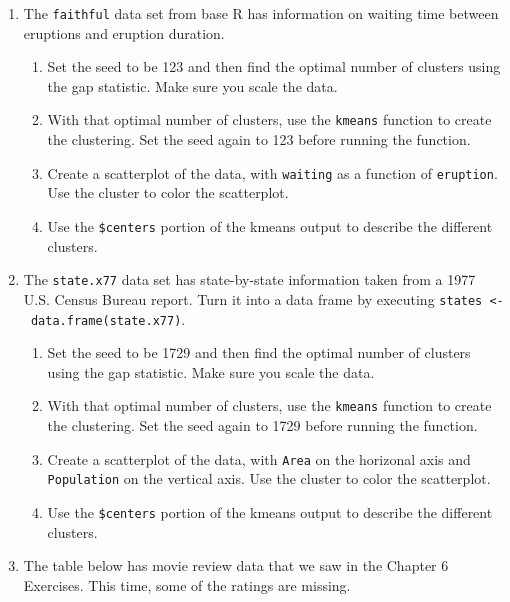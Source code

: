 \documentclass[
]{book}
\providecommand{\tightlist}{%
  \setlength{\itemsep}{0pt}\setlength{\parskip}{0pt}}
\theoremstyle{definition}
\theoremstyle{definition}
\theoremstyle{definition}
\theoremstyle{definition}
\theoremstyle{remark}
\begin{document}
\begin{enumerate}
\def\labelenumi{\arabic{enumi}.}
\setcounter{enumi}{2}
\tightlist
\item
  The \texttt{faithful} data set from base R has information on waiting time between eruptions and eruption duration.

  \begin{enumerate}
  \def\labelenumii{\alph{enumii}.}
  \tightlist
  \item
    Set the seed to be 123 and then find the optimal number of clusters using the gap statistic. Make sure you scale the data.
  \item
    With that optimal number of clusters, use the \texttt{kmeans} function to create the clustering. Set the seed again to 123 before running the function.
  \item
    Create a scatterplot of the data, with \texttt{waiting} as a function of \texttt{eruption}. Use the cluster to color the scatterplot.
  \item
    Use the \texttt{\$centers} portion of the kmeans output to describe the different clusters.
  \end{enumerate}
\item
  The \texttt{state.x77} data set has state-by-state information taken from a 1977 U.S. Census Bureau report. Turn it into a data frame by executing \texttt{states\ \textless{}-\ data.frame(state.x77)}.

  \begin{enumerate}
  \def\labelenumii{\alph{enumii}.}
  \tightlist
  \item
    Set the seed to be 1729 and then find the optimal number of clusters using the gap statistic. Make sure you scale the data.
  \item
    With that optimal number of clusters, use the \texttt{kmeans} function to create the clustering. Set the seed again to 1729 before running the function.
  \item
    Create a scatterplot of the data, with \texttt{Area} on the horizonal axis and \texttt{Population} on the vertical axis. Use the cluster to color the scatterplot.
  \item
    Use the \texttt{\$centers} portion of the kmeans output to describe the different clusters.
  \end{enumerate}
\item
  The table below has movie review data that we saw in the Chapter 6 Exercises. This time, some of the ratings are missing.


\end{enumerate}
\end{document}
